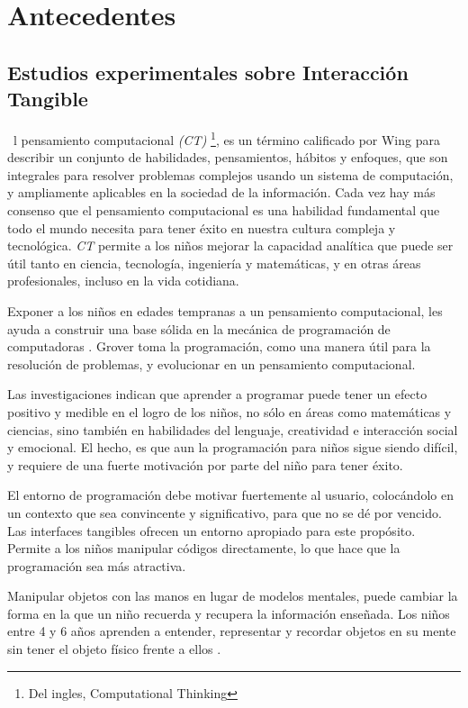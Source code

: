 \chapter{Antecedentes}
\label{chap:antecedentes}
\section{Estudios experimentales sobre Interacción Tangible}


~l pensamiento computacional \emph{(CT)} \footnote{Del ingles, Computational Thinking}, es un término calificado por Wing \cite{Wing} para describir un conjunto de habilidades, pensamientos, hábitos y enfoques, que son integrales para resolver problemas complejos usando un sistema de computación, y ampliamente aplicables en la sociedad de la información. Cada vez hay más consenso que el pensamiento computacional es una habilidad fundamental que todo el mundo necesita para tener éxito en nuestra cultura compleja y tecnológica. \emph{CT} permite a los niños mejorar la capacidad analítica que puede ser útil tanto en ciencia, tecnología, ingeniería y matemáticas, y en otras áreas profesionales, incluso en la vida cotidiana. 

Exponer a los niños en edades tempranas a un pensamiento computacional, les ayuda a construir una base sólida en la mecánica de programación de computadoras \cite{Grover}. Grover toma la programación, como una manera útil para la resolución de problemas, y evolucionar en un pensamiento computacional. 

Las investigaciones indican que aprender a programar puede tener un efecto positivo y medible en el logro de los niños, no sólo en áreas como matemáticas y ciencias, sino también en habilidades del lenguaje, creatividad e interacción social y emocional. El hecho, es que aun la programación para niños sigue siendo difícil, y requiere de una fuerte motivación por parte del niño para tener éxito.

El entorno de programación debe motivar fuertemente al usuario, colocándolo en un contexto que sea convincente y significativo, para que no se dé por vencido. Las interfaces tangibles ofrecen un entorno apropiado para este propósito. Permite a los niños manipular códigos directamente, lo que hace que la programación sea más atractiva. 

Manipular objetos con las manos en lugar de modelos mentales, puede cambiar la forma en la que un niño recuerda y recupera la información enseñada. Los niños entre 4 y 6 años aprenden a entender, representar y recordar objetos en su mente sin tener el objeto físico frente a ellos \cite{Piaget}.

